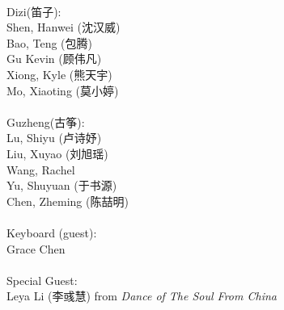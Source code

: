 \documentclass[letter,6pt,poets]{ConcProg}
\begin{document}
\begin{multicols}{2}
\\
Dizi(笛子): 				 \\    
Shen, Hanwei		(沈汉威)     \\
Bao, Teng  (包腾)\\
Gu Kevin   (顾伟凡)               \\
Xiong, Kyle (熊天宇)\\
Mo, Xiaoting (莫小婷)\\
\\
Guzheng(古筝):\\
Lu, Shiyu (卢诗妤)\\
Liu, Xuyao  (刘旭瑶)\\               
Wang, Rachel  \\
Yu, Shuyuan   (于书源)\\
Chen, Zheming  (陈喆明)\\
\\
Keyboard (guest):\\
Grace Chen
\\
\\
Special Guest:\\
Leya Li (李彧慧)
 \small{ from \emph{ Dance of The Soul From China}}
\\
\end{multicols}
\end{document}
